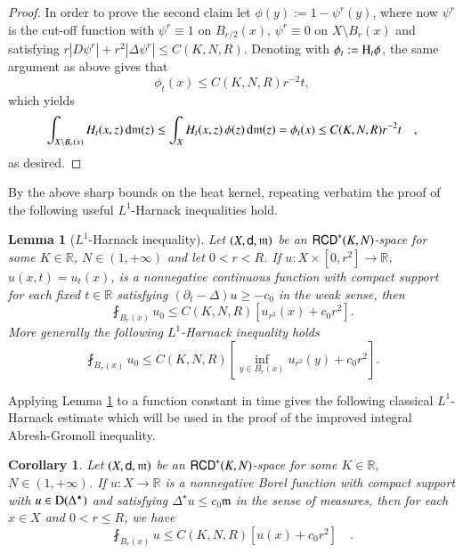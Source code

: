 \documentclass[11pt,reqno]{amsart}
\newcommand{\dom}{\rm D}
\newcommand{\mm}{\mathfrak m}
\newcommand{\sfd}{{\sf d}}
\renewcommand{\H}{{\rm H}}
\renewcommand{\d}{{\rm{d}}}
\newcommand{\R}{\mathbb{R}}
\newcommand{\RCD}{{\sf RCD}}
\newtheorem{lemma}[theorem]{Lemma}
\newtheorem{corollary}[theorem]{Corollary}
\theoremstyle{definition}
\theoremstyle{remark}
\theoremstyle{remark}
\theoremstyle{remark}
\theoremstyle{remark}
\theoremstyle{remark}
\theoremstyle{remark}
\theoremstyle{remark}
\begin{document}
\begin{proof}
In order to prove the second claim let $\phi(y):=1-\psi^r(y)$, where now $\psi^r$ is the cut-off function with $\psi^r\equiv 1$ on $B_{r/2}(x)$, $\psi^r\equiv 0$ on $X\setminus B_{r}(x)$ and satisfying   $r|D\psi^r|+r^2|\Delta \psi^r|\leq C(K,N,R)$.
Denoting with $\phi_t:=\H_t \phi$, the same argument as above gives that
$$\phi_t(x) \leq C(K,N,R) r^{-2} t, $$
which yields 
$$\int_{X\setminus B_r(x)} H_t(x,z) \, \d \mm(z) \leq \int_X  H_t(x,z) \, \phi(z) \, \d \mm(z)=\phi_t(x)\leq C(K,N,R) r^{-2} t \quad,  $$
as desired.
\end{proof}

By the above sharp bounds on the heat kernel, repeating verbatim the proof of \cite[Lemma 2.1 and Remark 2.2]{CN} the following useful $L^1$-Harnack inequalities  hold.

\begin{lemma}[$L^1$-Harnack inequality]\label{lem2.1}
Let $(X,\sfd,\mm)$ be an  $\RCD^*(K,N)$-space for some $K \in \R$, $N \in (1,+\infty)$ and let $0<r<R$. If $u:X \times [0,r^2]\to \R$, $u(x,t)=u_t(x)$,  is a nonnegative  continuous function with compact support for each fixed $t\in \R$ satisfying $(\partial_t - \Delta) u \geq -c_0$ in the weak sense, then 
\begin{equation}\label{eq:MeanValue}
\fint_{B_r(x)} u_0 \leq C(K,N,R) \left[ u_{r^2}(x)+ c_0 r^2 \right].
\end{equation}
More generally the following $L^1$-Harnack inequality holds
\begin{equation}\label{eq:L1Harnack}
\fint_{B_r(x)} u_0 \leq C(K,N,R) \left[\inf_{y\in B_r(x)} u_{r^2}(y)+ c_0 r^2 \right].
\end{equation}
\end{lemma}

\noindent Applying Lemma \ref{lem2.1} to  a function constant in time gives the following classical $L^1$-Harnack estimate which will be used in the proof of the improved integral Abresh-Gromoll inequality.

\begin{corollary}\label{cor2.4}
Let $(X,\sfd,\mm)$ be an  $\RCD^*(K,N)$-space for some $K \in \R$, $N \in (1,+\infty)$.  If $u:X\to \R$ is a nonnegative Borel function with compact support with $u \in \dom(\Delta^\star)$ and satisfying $\Delta^\star u \leq c_0 \mm$ in the sense of measures, then for each $x \in X$ and $0<r\leq R$, we have
\begin{equation}\label{eq:MeanValueConst}
\fint_{B_r(x)} u \leq C(K,N,R) \left[ u(x)+ c_0 r^2 \right] \quad.
\end{equation}
\end{corollary}
\end{document}

